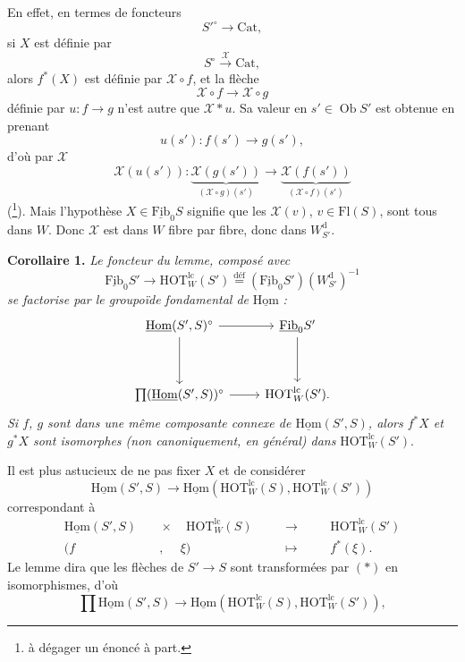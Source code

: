 \documentclass[11pt,leqno]{article}
\newcommand{\printedpage}[1]{\marginpar{\footnotesize p.~#1}}
\newcommand{\msp}[1]{\marginpar{\footnotesize [#1]}}
\newcommand{\fl}{\longrightarrow}
\newcommand{\uHom}{\underline{\mathrm{Hom}}}
\newcommand{\uFib}{\underline{\mathrm{Fib}}}
\newcommand{\Ob}{\operatorname{Ob}}
\newcommand{\HOT}{\mathrm{HOT}}
\newcommand{\Cat}{\mathrm{Cat}}
\begin{document}
\printedpage{33}
En effet, en termes de foncteurs
\[ S'^{\circ}\fl\Cat, \]
si $X$ est définie par
\[ S^{\circ}\xrightarrow{\ \mathscr{X}\ }\Cat, \]
alors $f^*(X)$ est définie par $\mathscr{X}\circ f$, et la flèche
\[ \mathscr{X}\circ f\fl\mathscr{X}\circ g \]
définie par $u : f\fl g$ n'est autre que $\mathscr{X}*u$. Sa valeur en $s'\in\Ob S'$ est obtenue en prenant
\[ u(s') : f(s')\fl g(s'), \]
d'où par $\mathscr{X}$
\[ \mathscr{X}(u(s')) : \underbrace{\mathscr{X}(g(s'))}_{(\mathscr{X}\circ g)(s')}\fl\underbrace{\mathscr{X}(f(s'))}_{(\mathscr{X}\circ f)(s')} \]
(\footnote[53]{à dégager un énoncé à part.}). Mais l'hypothèse $X\in\uFib_0S$ signifie que les $\mathscr{X}(v)$, $v\in\mathrm{Fl}(S)$, sont tous dans $W$. Donc
\msp{page 45}$\mathscr{X}$ est dans $W$ fibre par fibre, donc dans $W^{\mathrm{d}}_{S'}$.

\textbf{Corollaire 1.} \textit{Le foncteur du lemme, composé avec}
\[ \uFib_0S'\fl\HOT^{\mathrm{lc}}_W(S')\overset{\text{déf}}{=}(\uFib_0S')(W^{\mathrm{d}}_{S'})^{-1} \]
\textit{se factorise par le groupoïde fondamental de} $\uHom$ \textit{:}
\[
\begin{tikzcd}[row sep=huge]
\uHom(S',S)^{\circ} \arrow[r] \arrow[d] & \uFib_0S' \arrow[d] \\
\textstyle\prod(\uHom(S',S))^{\circ} \arrow[r] & \HOT^{\mathrm{lc}}_W(S').
\end{tikzcd}
\]
\textit{Si $f$, $g$ sont dans une même composante connexe de $\uHom(S',S)$, alors $f^*X$ et $g^*X$ sont isomorphes (non canoniquement, en général) dans} $\HOT^{\mathrm{lc}}_W(S')$.

Il est plus astucieux de ne pas fixer $X$ et de considérer
\[ \uHom(S',S)\fl\uHom(\HOT^{\mathrm{lc}}_W(S),\HOT^{\mathrm{lc}}_W(S')) \tag*{$(*)$} \]
correspondant à
\[
\begin{aligned}
\uHom(S',S) &\quad\times\quad \HOT^{\mathrm{lc}}_W(S) &&\quad\longrightarrow\quad &&\HOT^{\mathrm{lc}}_W(S')\\
(f &\quad,\quad\ \xi) &&\quad\longmapsto\quad && f^*(\xi).
\end{aligned}
\]
Le lemme dira que les flèches de $S'\fl S$ sont transformées par $(*)$ en isomorphismes, d'où
\[ \prod\uHom(S',S)\fl\uHom(\HOT^{\mathrm{lc}}_W(S),\HOT^{\mathrm{lc}}_W(S')), \]
\end{document}
